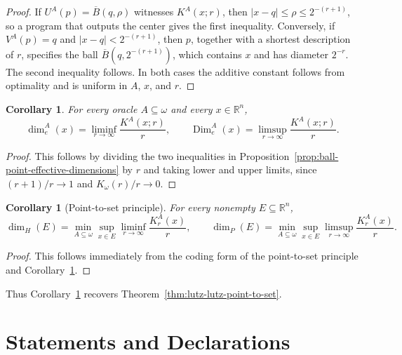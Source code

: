 \documentclass[a4paper,oneside,reqno,12pt]{amsart}
\theoremstyle{plain}
\newtheorem{corollary}[theorem]{Corollary}
\theoremstyle{definition}
\theoremstyle{remark}
\DeclareMathOperator{\Dim}{Dim}
\begin{document}
\begin{proof}
If \(U^A(p)=\overline B(q,\rho)\) witnesses \(K^A(x;r)\), then
\(|x-q|\le\rho\le 2^{-(r+1)}\), so a program that outputs the center gives the
first inequality.  Conversely, if \(V^A(p)=q\) and
\(|x-q|<2^{-(r+1)}\), then \(p\), together with a shortest description of
\(r\), specifies the ball \(\overline B(q,2^{-(r+1)})\), which contains \(x\)
and has diameter \(2^{-r}\).  The second inequality follows.  In both cases the
additive constant follows from optimality and is uniform in \(A\), \(x\), and
\(r\).
\end{proof}

\begin{corollary}
\label{cor:ball-point-effective-dimensions}
For every oracle \(A\subseteq\omega\) and every \(x\in\mathbb R^n\),
\[
\dim_e^A(x)
=
\liminf_{r\to\infty}\frac{K^A(x;r)}{r},
\qquad
\Dim_e^A(x)
=
\limsup_{r\to\infty}\frac{K^A(x;r)}{r}.
\]
\end{corollary}

\begin{proof}
This follows by dividing the two inequalities in
Proposition~\ref{prop:ball-point-effective-dimensions} by \(r\) and taking lower
and upper limits, since \((r+1)/r\to1\) and \(K_\omega(r)/r\to0\).
\end{proof}



\begin{corollary}[Point-to-set principle]
\label{cor:rational-point-point-to-set}
For every nonempty \(E\subseteq\mathbb R^n\),
\[
\dim_H(E)=\min_{A\subseteq\omega}\sup_{x\in E}\liminf_{r\to\infty}\frac{K^A_r(x)}{r},
\qquad
\dim_P(E)=\min_{A\subseteq\omega}\sup_{x\in E}\limsup_{r\to\infty}\frac{K^A_r(x)}{r}.
\]
\end{corollary}

\begin{proof}
This follows immediately from the coding form of the point-to-set principle and
Corollary~\ref{cor:ball-point-effective-dimensions}.
\end{proof}

Thus Corollary~\ref{cor:rational-point-point-to-set} recovers
Theorem~\ref{thm:lutz-lutz-point-to-set}.

\section*{Statements and Declarations}

\end{document}
